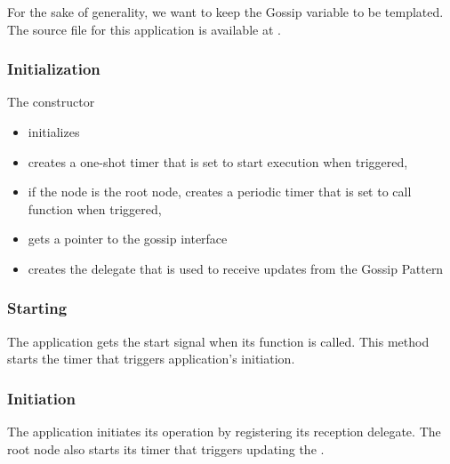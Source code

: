 For the sake of generality, we want to keep the Gossip variable to be templated. The source file for this application is available at .

\subsubsection{Initialization}
The constructor 
\begin{itemize}
	\item initializes  
	
	\item creates a one-shot timer that is set to start execution when triggered,
	
	\item if the node is the root node, creates a periodic timer that is set to call  function when triggered,
	
	\item gets a pointer to the gossip interface
		
	\item creates the delegate that is used to receive updates from the Gossip Pattern
		
\end{itemize}

\subsubsection{Starting}

The application gets the start signal when its  function is called. This method starts the timer that triggers application's initiation.  



\subsubsection{Initiation}

The application initiates its operation by registering its reception delegate. The root node also starts its timer that triggers updating the . 

